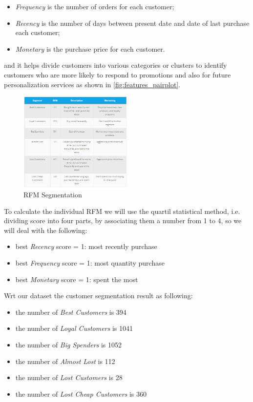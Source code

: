 \begin{itemize}
\item \emph{Frequency} is the number of orders for each customer;
\item \emph{Recency} is the number of days between present date and date of last purchase each customer;
\item \emph{Monetary} is the purchase price for each customer.
\end{itemize}

and it helps divide customers into various categories or clusters to identify customers who are more likely to respond to promotions and also for future personalization services as shown in \ref{fig:features_pairplot}.

\begin{figure}[!h]
\centering
\includegraphics[width=0.5\textwidth]{img/preparation/rfm_seg.png}
\caption{RFM Segmentation}
\label{fig:rfm_seg}
\end{figure}

To calculate the individual RFM we will use the quartil statistical method, i.e. dividing score into four parts, by associating them a number from 1 to 4, so we will deal with the following:

\begin{itemize}
\item best \emph{Recency} score = 1: most recently purchase
\item best \emph{Frequency} score = 1: most quantity purchase
\item best \emph{Monetary} score = 1: spent the most
\end{itemize}

Wrt our dataset the customer segmentation result as following:

\begin{itemize}
\item the number of \emph{Best Customers} is 394
\item the number of \emph{Loyal Customers} is 1041
\item the number of \emph{Big Spenders} is 1052
\item the number of \emph{Almost Lost} is 112
\item the number of \emph{Lost Customers} is 28
\item the number of \emph{Lost Cheap Customers} is 360
\end{itemize}

